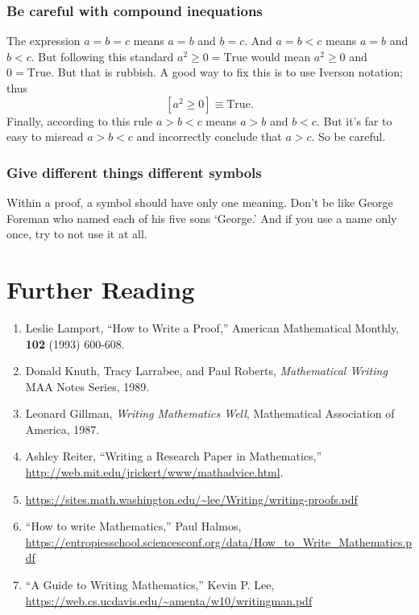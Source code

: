 \documentclass[12pt,fleqn]{article}
\newenvironment{numlist}{
  \begin{enumerate}[(1)]
    \addtolength{\itemsep}{-1.0\itemsep}}
  {\end{enumerate}}
\newcounter{ex}\setcounter{ex}{0}
\newcounter{id}\setcounter{id}{0}
\newcounter{se}\setcounter{se}{0}
\begin{document}
\subsubsection{Be careful with compound inequations}

The expression $a=b=c$ means $a=b$ and $b=c$. And 
$a=b<c$ means $a=b$ and $b<c$. But following this
standard $a^2 \geq 0 = \mbox{True}$ would mean
$a^2 \geq 0$ and $0 = \mbox{True}$. But that is rubbish.
A good way to fix this is to use Iverson notation; thus
\begin{equation*}
 \left[a^2 \geq 0 \right] \equiv \mbox{True}.
\end{equation*}
Finally, according to this rule $a>b<c$ means $a>b$ and $b< c$. But
 it's far to easy to misread $a>b<c$ and incorrectly conclude that
 $a > c$.  So be careful.

\subsubsection{Give different things different symbols}

Within a proof, a symbol should have only one meaning. Don't be like
George Foreman who named each of his five sons `George.' And if you use 
a name only once, try to not use it at all.


\section*{Further Reading}

\begin{numlist}

\item Leslie Lamport, ``How to Write a Proof,'' American Mathematical Monthly, \textbf{102} 
(1993) 600-608.  

\item Donald Knuth, Tracy Larrabee, and Paul Roberts,  \emph{Mathematical   Writing} MAA Notes Series, 1989.

\item Leonard Gillman, \emph{Writing Mathematics Well}, Mathematical
Association of America, 1987.

\item Ashley Reiter, ``Writing a Research Paper in Mathematics,''  \url{http://web.mit.edu/jrickert/www/mathadvice.html}.

\item \url{https://sites.math.washington.edu/~lee/Writing/writing-proofs.pdf}


\item ``How to write Mathematics,'' Paul Halmos, \url{https://entropiesschool.sciencesconf.org/data/How_to_Write_Mathematics.pdf}

\item ``A Guide to Writing Mathematics,'' Kevin P. Lee,  \url{https://web.cs.ucdavis.edu/~amenta/w10/writingman.pdf}


\end{numlist}
\end{document}
